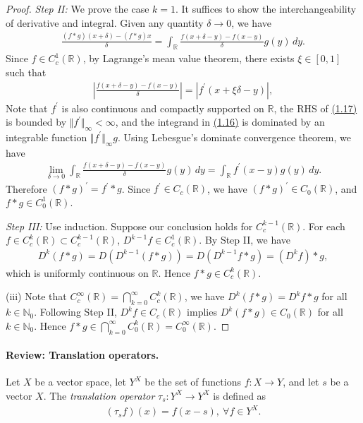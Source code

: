 \documentclass{article}
\renewcommand{\proofname}{\textit{Proof}}
\begin{document}
\begin{proof}
\textit{Step II:} We prove the case $k=1$. It suffices to show the interchangeability of derivative and integral. Given any quantity $\delta\to 0$, we have
\begin{align*}
	\frac{(f*g)(x+\delta) - (f*g)x}{\delta} = \int_\mathbb{R} \frac{f(x+\delta - y) - f(x-y)}{\delta}g(y)\,dy.\tag{1.16}\label{eq:1.16}
\end{align*}
Since $f\in C^1_c(\mathbb{R})$, by Lagrange's mean value theorem, there exists $\xi\in[0,1]$ such that
\begin{align*}
	\left\vert\frac{f(x+\delta - y) - f(x-y)}{\delta}\right\vert = \left\vert f^\prime(x+\xi\delta - y)\right\vert,\tag{1.17}\label{eq:1.17}
\end{align*}
Note that $f^\prime$ is also continuous and compactly supported on $\mathbb{R}$, the RHS of \hyperref[eq:1.17]{(1.17)} is bounded by $\Vert f^\prime\Vert_\infty <\infty$, and the integrand in \hyperref[eq:1.16]{(1.16)} is dominated by an integrable function $\Vert f^\prime\Vert_\infty g$. Using Lebesgue's dominate convergence theorem, we have
\begin{align*}
	\lim_{\delta\to 0}\int_\mathbb{R}\frac{f(x+\delta - y) - f(x-y)}{\delta}g(y)\,dy = \int_\mathbb{R} f^\prime(x-y)g(y)\,dy.
\end{align*}
Therefore $(f*g)^\prime = f^\prime * g$. Since $f^\prime\in C_c(\mathbb{R})$, we have $(f*g)^\prime\in C_0(\mathbb{R})$, and $f*g\in C_0^1(\mathbb{R})$.
\vspace{0.1cm}

\textit{Step III:} Use induction. Suppose our conclusion holds for $C_c^{k-1}(\mathbb{R})$. For each $f\in C^k_c(\mathbb{R})\subset C^{k-1}_c(\mathbb{R})$, $D^{k-1} f\in C^1_c(\mathbb{R})$. By Step II, we have 
\begin{align*}
	D^k(f*g) = D(D^{k-1}(f*g)) = D(D^{k-1}f*g) = (D^k f)* g,
\end{align*} 
which is uniformly continuous on $\mathbb{R}$. Hence $f*g\in C_c^k(\mathbb{R})$.
\vspace{0.1cm}

(iii) Note that $C_c^\infty(\mathbb{R}) = \bigcap_{k=0}^\infty C_c^k(\mathbb{R})$, we have $D^k(f*g) = D^k f * g$ for all $k\in\mathbb{N}_0$. Following Step II, $D^k f\in C_c(\mathbb{R})$ implies $D^k(f*g)\in C_0(\mathbb{R})$ for all $k\in\mathbb{N}_0$. Hence $f*g\in\bigcap_{k=0}^\infty C_0^k(\mathbb{R}) = C_0^\infty(\mathbb{R})$.
\end{proof}
\renewcommand{\proofname}{Proof}

\paragraph{Review: Translation operators.} Let $X$ be a vector space, let $Y^X$ be the set of functions $f:X\to Y$, and let $s$ be a vector $X$. The \textit{translation operator} $\tau_s:Y^X\to Y^X$ is defined as
\begin{align*}
	(\tau_s f)(x) = f(x-s),\ \forall f\in Y^X.
\end{align*}
\end{document}
